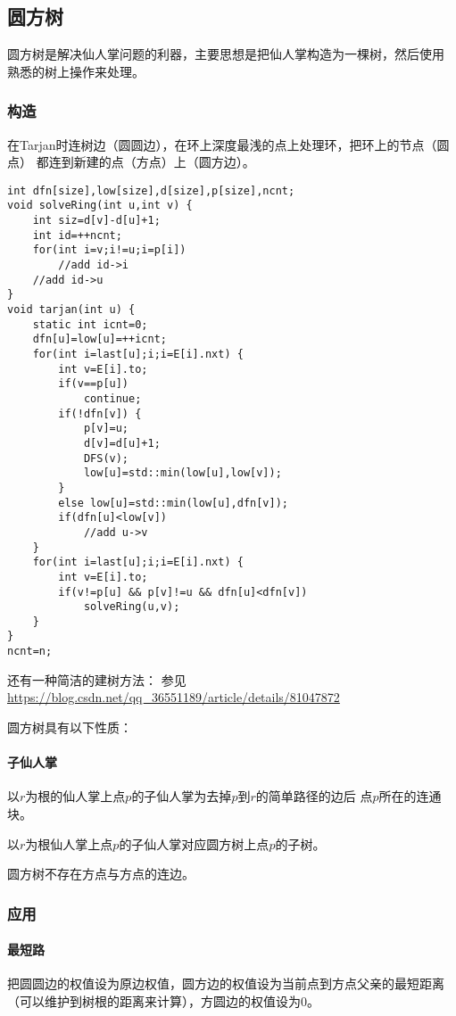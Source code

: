 \subsection{圆方树}
圆方树是解决仙人掌问题的利器，主要思想是把仙人掌构造为一棵树，然后使用
熟悉的树上操作来处理。
\subsubsection{构造}
在Tarjan时连树边（圆圆边），在环上深度最浅的点上处理环，把环上的节点（圆点）
都连到新建的点（方点）上（圆方边）。

\begin{lstlisting}
int dfn[size],low[size],d[size],p[size],ncnt;
void solveRing(int u,int v) {
    int siz=d[v]-d[u]+1;
    int id=++ncnt;
    for(int i=v;i!=u;i=p[i])
        //add id->i
    //add id->u
}
void tarjan(int u) {
    static int icnt=0;
    dfn[u]=low[u]=++icnt;
    for(int i=last[u];i;i=E[i].nxt) {
        int v=E[i].to;
        if(v==p[u])
            continue;
        if(!dfn[v]) {
            p[v]=u;
            d[v]=d[u]+1;
            DFS(v);
            low[u]=std::min(low[u],low[v]);
        }
        else low[u]=std::min(low[u],dfn[v]);
        if(dfn[u]<low[v])
            //add u->v
    }
    for(int i=last[u];i;i=E[i].nxt) {
        int v=E[i].to;
        if(v!=p[u] && p[v]!=u && dfn[u]<dfn[v])
            solveRing(u,v);
    }
}
ncnt=n;
\end{lstlisting}

还有一种简洁的建树方法：
参见\url{https://blog.csdn.net/qq\_36551189/article/details/81047872}

圆方树具有以下性质：
\paragraph{子仙人掌} 以$r$为根的仙人掌上点$p$的子仙人掌为去掉$p$到$r$的简单路径的边后
点$p$所在的连通块。
\begin{property}
    以$r$为根仙人掌上点$p$的子仙人掌对应圆方树上点$p$的子树。
\end{property}
\begin{property}
    圆方树不存在方点与方点的连边。
\end{property}

\subsubsection{应用}
\paragraph{最短路}
把圆圆边的权值设为原边权值，圆方边的权值设为当前点到方点父亲的最短距离
（可以维护到树根的距离来计算），方圆边的权值设为0。

